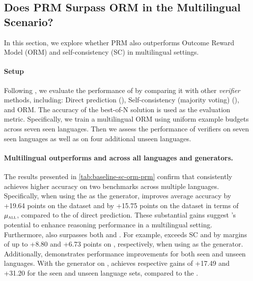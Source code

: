 \subsection{Does PRM Surpass ORM in the Multilingual Scenario?}
\label{sec:analysis_prmorm}


In this section, we explore whether PRM also outperforms Outcome Reward Model (ORM) and self-consistency (SC) \citep{sc} in multilingual settings.

\paragraph{Setup}

Following \citet{prm800k,shepherd}, we evaluate the performance of \mix by comparing it with other \textit{verifier} methods, including: Direct prediction (\baseline), Self-consistency (majority voting) (\scmethod), and ORM. The accuracy of the best-of-N solution is used as the evaluation metric. Specifically, we train a multilingual ORM using uniform example budgets across seven seen languages. Then we assess the performance of verifiers on seven seen languages as well as on four additional unseen languages.


\paragraph{Multilingual \prm outperforms \scmethod and \orm across all languages and generators.} 




The results presented in \autoref{tab:baseline-sc-orm-prm} confirm that \prm consistently achieves higher accuracy on two benchmarks across multiple languages. Specifically, when using the \llama as the generator, \prm improves average accuracy by +19.64 points on the \mathset dataset and by +15.75 points on the \mgsmset dataset in terms of $\mu_{\textsc{all}}$, compared to the \baseline of direct prediction. These substantial gains suggest \prm's potential to enhance reasoning performance in a multilingual setting. Furthermore, \prm also surpasses both \scmethod and \orm. For example, \prm exceeds SC and \orm by margins of up to +8.80 and +6.73 points on \mgsmset, respectively, when using \llama as the generator. Additionally, \prm demonstrates performance improvements for both seen and unseen languages. With the \deepseek generator on \mgsmset, \prm achieves respective gains of +17.49 and +31.20 for the seen and unseen language sets, compared to the \baseline. 



